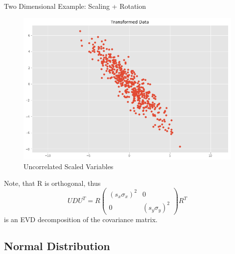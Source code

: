 \documentclass[11pt, usenames, dvipsnames]{beamer}
\begin{document}
\begin{frame}{Two Dimensional Example: Scaling + Rotation}
\begin{figure}[h!]
  \centering
    \includegraphics[scale=0.2]{correlated.png}  
   \caption{Uncorrelated Scaled Variables}
\end{figure}

\pause

Note, that R is orthogonal, thus $$UDU^T=R\left( \begin{array}{ccc}  (s_x\sigma_x)^2 & 0 \\  0 & (s_y\sigma_y)^2 \end{array} \right)R^T
$$
is an EVD decomposition of the covariance matrix.
    
\end{frame}

\subsection{Normal Distribution}

\begingroup
\small%
\end{document}
